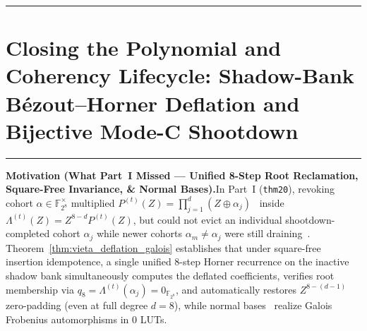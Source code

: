 \documentclass[10pt,twocolumn]{article}
\makeatletter
\newif\ifspecintwocol \specintwocolfalse
\newif\ifspecresume   \specresumefalse
\newcommand{\StartTwoCol}{%
  \if@twocolumn
    \let\spec@next\@empty
  \else
    \ifspecintwocol
      \let\spec@next\@empty
    \else
      \global\specintwocoltrue
      \def\spec@next{\begin{multicols}{2}}%
    \fi
  \fi
  \spec@next
}
\newcommand{\StopTwoCol}{%
  \if@twocolumn
    \onecolumn
    \global\specintwocolfalse
    \let\spec@next\@empty
  \else
    \ifspecintwocol
      \global\specintwocolfalse
      \def\spec@next{\end{multicols}}%
    \else
      \let\spec@next\@empty
    \fi
  \fi
  \spec@next
}
\newcommand{\BeginConnesPlate}{%
  \if@twocolumn
    \onecolumn
    \global\specresumetrue
    \let\spec@platepre\@empty
  \else
    \ifspecintwocol
      \global\specresumetrue
      \let\spec@platepre\StopTwoCol
    \else
      \global\specresumefalse
      \let\spec@platepre\@empty
    \fi
  \fi
  \spec@platepre
  \par\vspace{4pt}\noindent\textcolor{black!25}{\rule{\textwidth}{0.4pt}}\par\vspace{3pt}%
}
\newcommand{\EndConnesPlate}{%
  \par\vspace{3pt}\noindent\textcolor{black!25}{\rule{\textwidth}{0.4pt}}\par\vspace{4pt}%
  \ifspecresume
    \global\specresumefalse
    \let\spec@platepost\StartTwoCol
  \else
    \let\spec@platepost\@empty
  \fi
  \spec@platepost
}
\theoremstyle{spectralthm}
\makeatother
\begin{document}
\begin{minipage}{\textwidth}
{%
}
\label{fig:airlock_lifecycle}
\end{minipage}
\EndConnesPlate

\section{Closing the Polynomial and Coherency Lifecycle: Shadow-Bank B\'{e}zout--Horner Deflation and Bijective Mode-C Shootdown}
\label{sec:vieta_snoop}

\BeginConnesPlate
\noindent\textbf{Motivation (What Part~I Missed --- Unified 8-Step Root Reclamation, Square-Free Invariance, \& Normal Bases).}\;In Part~I (\texttt{thm20}), revoking cohort $\alpha \in \mathbb{F}_{2^8}^\times$ multiplied $P^{(t)}(Z) = \prod_{j=1}^d (Z \oplus \alpha_j)$~\cite{macwilliams1977theory} inside $\Lambda^{(t)}(Z) = Z^{8-d} P^{(t)}(Z)$, but could not evict an individual shootdown-completed cohort $\alpha_j$ while newer cohorts $\alpha_m \neq \alpha_j$ were still draining~\cite{filardo2024cornucopiareloaded}. Theorem~\ref{thm:vieta_deflation_galois} establishes that under square-free insertion idempotence, a single unified 8-step Horner recurrence on the inactive shadow bank simultaneously computes the deflated coefficients, verifies root membership via $q_8 = \Lambda^{(t)}(\alpha_j) = 0_{\mathbb{F}_{2^8}}$, and automatically restores $Z^{8-(d-1)}$ zero-padding (even at full degree $d=8$), while normal bases~\cite{mullin1989optimal,diamond2025binius} realize Galois Frobenius automorphisms in $0$ LUTs.
\end{document}
